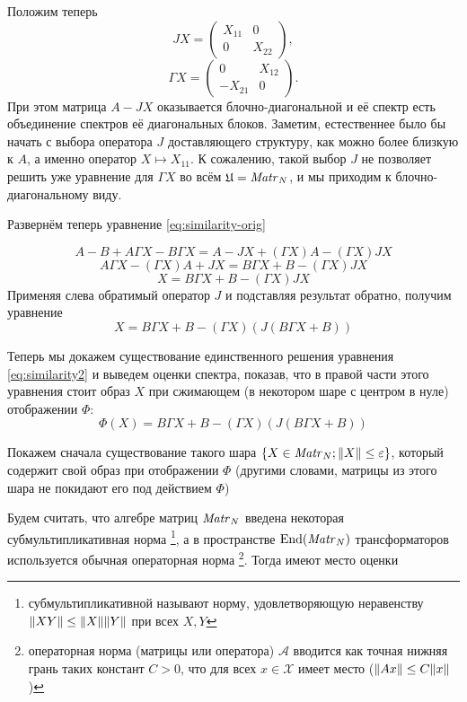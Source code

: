 Положим теперь
\[
    JX = \begin{pmatrix}
        X_{11} & 0 \\
        0      & X_{22}
    \end{pmatrix},
    \]
\[ \Gamma X =
    \begin{pmatrix}
        0       & X_{12} \\
        -X_{21} & 0
    \end{pmatrix}.
    \]
При этом матрица \( A - JX \) оказывается блочно-диагональной
и её спектр есть объединение спектров её диагональных блоков.
Заметим, естественнее было бы начать с выбора оператора \( J \) доставляющего структуру,
как можно более близкую к \( A \), а именно
оператор \( X\mapsto X_{11} \).
К сожалению, такой выбор \( J \) не позволяет решить
уже уравнение для \(\Gamma X\) во всём \(\mathfrak U = \mathit{Matr}_{N} {}\),
и мы приходим к блочно-диагональному виду.

Развернём теперь уравнение \eqref{eq:similarity-orig}

\[
    A - B + A\Gamma X - B\Gamma X = A - JX + (\Gamma X) A - (\Gamma X) JX
    \]
\[
    A\Gamma X - (\Gamma X) A + JX = B \Gamma X + B - (\Gamma X) JX
    \]
\[
    X = B \Gamma X + B - (\Gamma X) JX
    \]
Применяя слева обратимый оператор \( J \) и подставляя результат обратно, получим уравнение
\begin{equation}\label{eq:similarity2}
    X = B \Gamma X + B - (\Gamma X) (J(B\Gamma X + B))
\end{equation}

Теперь мы докажем существование единственного решения уравнения \eqref{eq:similarity2}
и выведем оценки спектра,
показав, что в правой части этого уравнения стоит образ \( X \)
при сжимающем (в некотором шаре с центром в нуле) отображении \( \Phi \):
\[ \Phi(X) = B \Gamma X + B - (\Gamma X) (J(B\Gamma X + B)) \]

Покажем сначала существование такого шара \( \{ X\in\mathit{Matr}_{N} {}; {\left\|{X}\right\|} \leq \varepsilon \} \),
который содержит свой образ при отображении \( \Phi \)
(другими словами, матрицы из этого шара
 не покидают его под действием \( \Phi \))

Будем считать, что алгебре матриц \( \mathit{Matr}_{N} {} \)
введена некоторая субмультипликативная норма
\footnote{субмультипликативной называют норму, удовлетворяющую неравенству \( {\left\|{XY}\right\|}\leq {\left\|{X}\right\|}{\left\|{Y}\right\|} \) при всех \( X, Y \) },
а в пространстве \( \mathrm{End}({\mathit{Matr}_{N} {}}) \) трансформаторов
используется обычная операторная норма%
\footnote{операторная норма
(матрицы или оператора) \( \mathcal A \)
вводится как точная нижняя грань таких констант \( C > 0 \),
что для всех \( x\in\mathscr X\) имеет место
(\( {\left\|{A x}\right\|} \leq C {\left\|{x}\right\|} \))}.
Тогда имеют место оценки

